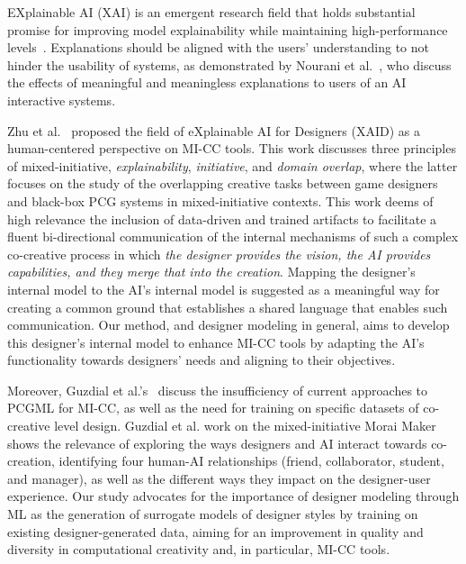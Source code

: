 



EXplainable AI (XAI) is an emergent research field that holds substantial promise for improving model explainability while maintaining high-performance levels~\cite{p10adadi2018peeking,Doshi-Velez2018}. Explanations should be aligned with the users' understanding to not hinder the usability of systems, as demonstrated by Nourani et al.~\cite{p10Nourani2019-meaningfulExplanations}, who discuss the effects of meaningful and meaningless explanations to users of an AI interactive systems.

Zhu et al.~\cite{p10Zhu2018-XAIDesignersMICC} proposed the field of eXplainable AI for Designers (XAID) as a human-centered perspective on MI-CC tools. This work discusses three principles of mixed-initiative, \emph{explainability}, \emph{initiative}, and \emph{domain overlap}, where the latter focuses on the study of the overlapping creative tasks between game designers and black-box PCG systems in mixed-initiative contexts. This work deems of high relevance the inclusion of data-driven and trained artifacts to facilitate a fluent bi-directional communication of the internal mechanisms of such a complex co-creative process in which \textit{the designer provides the vision, the AI provides capabilities, and they merge that into the creation}. Mapping the designer's internal model to the AI's internal model is suggested as a meaningful way for creating a common ground that establishes a shared language that enables such communication. Our method, and designer modeling in general, aims to develop this designer's internal model to enhance MI-CC tools by adapting the AI's functionality towards designers' needs and aligning to their objectives.






Moreover, Guzdial et al.'s~\cite{p10guzdial-lvldsg-aiide-2018} discuss the insufficiency of current approaches to PCGML for MI-CC, as well as the need for training on specific datasets of co-creative level design. Guzdial et al. work on the mixed-initiative Morai Maker~\cite{p10guzdial2019friend} shows the relevance of exploring the ways designers and AI interact towards co-creation, identifying four human-AI relationships (friend, collaborator, student, and manager), as well as the different ways they impact on the designer-user experience. Our study advocates for the importance of designer modeling through ML as the generation of surrogate models of designer styles by training on existing designer-generated data, aiming for an improvement in quality and diversity in computational creativity and, in particular, MI-CC tools. 

